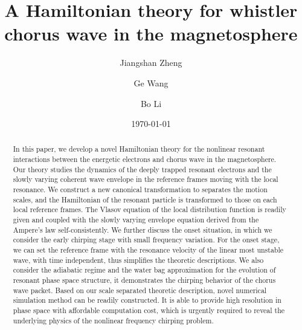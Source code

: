 \documentclass[showkeys,preprint]{revtex4-2}
\begin{document}
\title{A Hamiltonian theory for whistler chorus wave in the magnetosphere}
\author{Jiangshan Zheng}
\author{Ge Wang}
\author{Bo Li}
\date{\today}
\begin{abstract}
    In this paper, we develop a novel Hamiltonian theory for the nonlinear resonant interactions between the energetic electrons and chorus wave in the magnetosphere.
    Our theory studies the dynamics of the deeply trapped resonant electrons and the slowly varying coherent wave envelope in the reference frames moving with the local resonance.
    We construct a new canonical transformation to separates the motion scales, and the Hamiltonian of the resonant particle is transformed to those on each local reference frames.
    The Vlasov equation of the local distribution function is readily given and coupled with the slowly varying envelope equation derived from the Ampere's law self-consistently.
    We further discuss the onset situation, in which we consider the early chirping stage with small frequency variation.
    For the onset stage, we can set the reference frame with the resonance velocity of the linear most unstable wave, with time independent, thus simplifies the theoretic descriptions. 
    We also consider the adiabatic regime and the water bag approximation for the evolution of resonant phase space structure, it demonstrates the chirping behavior of the chorus wave packet.
    Based on our scale separated theoretic description, novel numerical simulation method can be readily constructed. It is able to provide high resolution in phase space with affordable computation cost, which is urgently required to reveal the underlying physics of the nonlinear frequency chirping problem.
\end{abstract}
\maketitle









%

\end{document}
